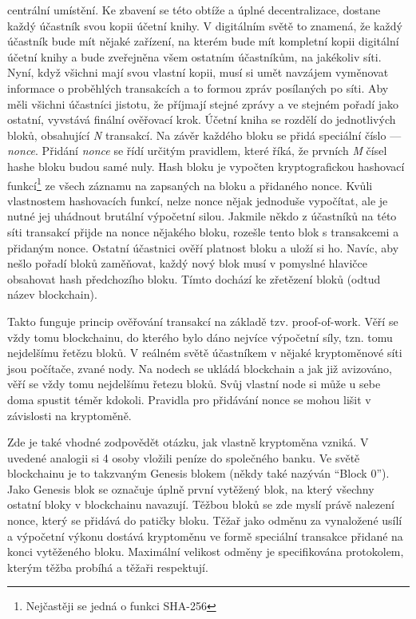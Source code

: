  centrální umístění. Ke zbavení se této obtíže a úplné decentralizace, dostane každý účastník svou kopii účetní knihy. V digitálním světě
to znamená, že
každý účastník bude mít nějaké zařízení, na kterém bude mít kompletní kopii digitální účetní knihy a bude zveřejněna všem ostatním účastníkům,
na jakékoliv síti. Nyní, když všichni mají svou vlastní kopii, musí si umět navzájem vyměnovat informace o proběhlých transakcích a to formou
zpráv posílaných po síti. Aby měli všichni účastníci jistotu, že příjmají stejné zprávy a ve stejném pořadí jako ostatní, vyvstává finální
ověřovací krok. Účetní kniha se rozdělí do jednotlivých bloků, obsahující \emph{N} transakcí. Na závěr každého bloku se přidá speciální
číslo --- \emph{nonce}. Přidání \emph{nonce} se řídí určitým pravidlem, které říká, že prvních \emph{M} čísel hashe bloku budou samé nuly.
Hash bloku je vypočten kryptografickou hashovací funkcí\footnote{Nejčastěji se jedná o funkci SHA-256} ze všech záznamu na zapsaných na bloku
a přidaného nonce. Kvůli vlastnostem hashovacích funkcí, nelze nonce nějak jednoduše vypočítat, ale je nutné jej uhádnout brutální výpočetní silou.
Jakmile někdo z účastníků na této síti transakcí přijde na nonce nějakého bloku, rozešle tento blok s transakcemi a přidaným nonce.
Ostatní účastnici ověří platnost bloku a uloží si ho. Navíc, aby nešlo pořadí bloků zaměňovat, každý nový blok musí v pomyslné hlavičce
obsahovat hash předchozího bloku. Tímto dochází ke zřetězení bloků (odtud název blockchain).

Takto funguje princip ověřování transakcí na základě tzv. proof-of-work. Věří se vždy tomu blockchainu, do kterého bylo dáno nejvíce
výpočetní síly, tzn. tomu nejdelšímu řetězu bloků. V reálném světě účastníkem v nějaké kryptoměnové síti jsou počítače, zvané nody.
Na nodech se ukládá blockchain a jak již avizováno, věří se vždy tomu nejdelšímu řetezu bloků. Svůj vlastní node si může u sebe doma spustit
téměr kdokoli. Pravidla pro přidávání nonce se mohou lišit v závislosti na kryptoměně.

Zde je také vhodné zodpovědět otázku, jak vlastně kryptoměna vzniká. V uvedené analogii si 4 osoby vložili peníze do společného banku.
Ve světě blockchainu je to takzvaným Genesis blokem (někdy také nazýván \enquote{Block 0}). Jako Genesis blok se označuje úplně první
vytěžený blok, na který všechny ostatní bloky v blockchainu navazují. Těžbou bloků se zde myslí právě nalezení nonce, který se přidává do patičky
bloku. Těžař jako odměnu za vynaložené usílí a výpočetní výkonu dostává kryptoměnu ve formě speciální transakce přidané na konci vytěženého bloku.
Maximální velikost odměny je specifikována protokolem, kterým těžba probíhá a těžaři respektují.

